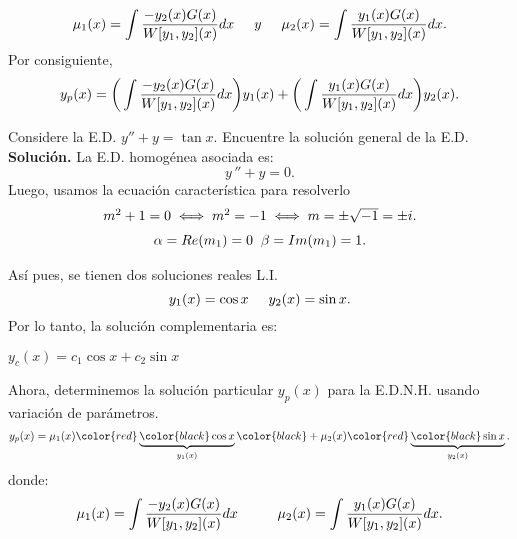 \documentclass[9pt]{beamer}
\begin{document}
\begin{frame}[t]
	\begin{block}{}
		\[
			\mu _1(x) = \displaystyle\int \dfrac{-y_2(x) G(x)}{W[y_1,y_2] (x)} dx \hspace{5mm} y \hspace{5mm} \mu _2(x) = \displaystyle\int \dfrac{y_1(x) G(x)}{W[y_1,y_2] (x)} dx.
		\]
		Por consiguiente,
		\[
			y_p(x) = \bigg(\displaystyle\int \dfrac{-y_2(x) G(x)}{W[y_1,y_2] (x)} dx\bigg) y_1(x) + \bigg(\displaystyle\int \dfrac{y_1(x) G(x)}{W[y_1,y_2] (x)} dx\bigg) y_2(x).
		\]
	\end{block}
	\begin{example}
		Considere la E.D. \(y'' +y = \tan x\). Encuentre la solución general de la E.D. \\[2mm]
		\textbf{Solución.} La E.D. homogénea asociada es:
		\[
			y\,'' +y = 0.
		\]
		Luego, usamos la ecuación característica para resolverlo \vspace{-3mm}
		\[
			\begin{array}{c}
				m^2+1 = 0 \iff m^2 = -1 \iff m = \pm \sqrt{-1} = \pm i. \\[2mm]
				\alpha = Re(m_1) = 0 \hspace{2mm} \beta = Im(m_1) = 1.
			\end{array}
		\]
	\end{example}
\end{frame}

\begin{frame}[t]
	\begin{exampleblock}{}
		Así pues, se tienen dos soluciones reales L.I.
		\[
			y_1(x) = \cos x \hspace{5mm} y_2(x) = \sin x.
		\]
		Por lo tanto, la solución complementaria es:
		\begin{center}
			\color{red} \underline{\color{black} \(y_c(x) = c_1 \cos x+ c_2 \sin x\)}
		\end{center}
		Ahora, determinemos la solución particular \(y_p(x)\) para la E.D.N.H. usando variación de parámetros.
		\[
			y_p(x) = \mu _1(x) \color{red} \underbrace{\color{black} \cos x} _{y_1(x)} \color{black} + \mu _2(x) \color{red} \underbrace{\color{black} \sin x} _{y_2(x)}.
		\]
		\color{black} donde:
		\[
			\mu _1(x) = \displaystyle\int \dfrac{-y_2(x) G(x)}{W[y_1,y_2] (x)} dx \hspace{1cm} \mu _2(x) = \displaystyle\int \dfrac{y_1(x) G(x)}{W[y_1,y_2] (x)} dx.
		\]
	\end{exampleblock}
\end{frame}
\end{document}
